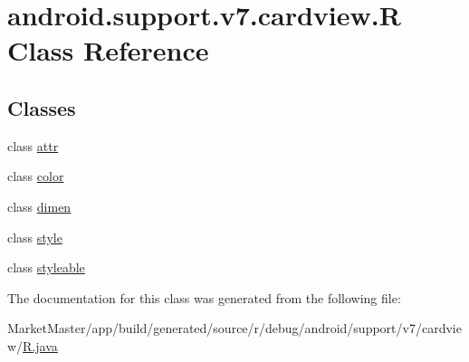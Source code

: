 \hypertarget{classandroid_1_1support_1_1v7_1_1cardview_1_1R}{}\section{android.\+support.\+v7.\+cardview.\+R Class Reference}
\label{classandroid_1_1support_1_1v7_1_1cardview_1_1R}
\subsection*{Classes}
\begin{DoxyCompactItemize}
\item 
class \mbox{\hyperlink{classandroid_1_1support_1_1v7_1_1cardview_1_1R_1_1attr}{attr}}
\item 
class \mbox{\hyperlink{classandroid_1_1support_1_1v7_1_1cardview_1_1R_1_1color}{color}}
\item 
class \mbox{\hyperlink{classandroid_1_1support_1_1v7_1_1cardview_1_1R_1_1dimen}{dimen}}
\item 
class \mbox{\hyperlink{classandroid_1_1support_1_1v7_1_1cardview_1_1R_1_1style}{style}}
\item 
class \mbox{\hyperlink{classandroid_1_1support_1_1v7_1_1cardview_1_1R_1_1styleable}{styleable}}
\end{DoxyCompactItemize}


The documentation for this class was generated from the following file\+:\begin{DoxyCompactItemize}
\item 
Market\+Master/app/build/generated/source/r/debug/android/support/v7/cardview/\mbox{\hyperlink{debug_2android_2support_2v7_2cardview_2R_8java}{R.\+java}}\end{DoxyCompactItemize}
